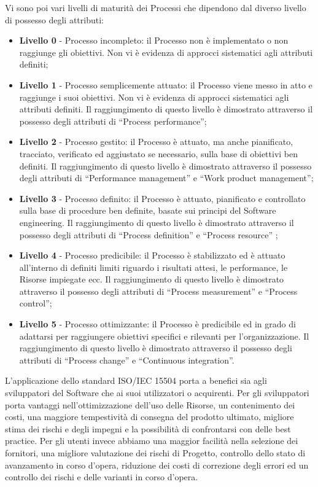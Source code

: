 Vi sono poi vari livelli di maturità dei Processi che dipendono dal diverso livello di possesso degli attributi:
\begin{itemize}
\item \textbf{Livello 0} - Processo incompleto: il Processo non è implementato o non raggiunge gli obiettivi. Non vi è evidenza di approcci sistematici agli attributi definiti;
\item \textbf{Livello 1} - Processo semplicemente attuato: il Processo viene messo in atto e raggiunge i suoi obiettivi. Non vi è evidenza di approcci sistematici agli attributi definiti. Il raggiungimento di questo livello è dimostrato attraverso il possesso degli attributi di “Process performance”;
\item \textbf{Livello 2} - Processo gestito: il Processo è attuato, ma anche pianificato, tracciato, verificato ed aggiustato se necessario, sulla base di obiettivi ben definiti. Il raggiungimento di questo livello è dimostrato attraverso il possesso degli attributi di “Performance management” e “Work product management”;
\item \textbf{Livello 3} - Processo definito: il Processo è attuato, pianificato e controllato sulla base di procedure ben definite, basate sui principi del Software engineering. Il raggiungimento di questo livello è dimostrato attraverso il possesso degli attributi di “Process definition” e “Process resource” ;
\item \textbf{Livello 4} - Processo predicibile: il Processo è stabilizzato ed è attuato all’interno di definiti limiti riguardo i risultati attesi, le performance, le Risorse impiegate ecc. Il raggiungimento di questo livello è dimostrato attraverso il possesso degli attributi di “Process measurement” e “Process control”;
\item \textbf{Livello 5} - Processo ottimizzante: il Processo è predicibile ed in grado di adattarsi per raggiungere obiettivi specifici e rilevanti per l’organizzazione.
Il raggiungimento di questo livello è dimostrato attraverso il possesso degli attributi di “Process change” e “Continuous integration”.
\end{itemize}

L’applicazione dello standard ISO/IEC 15504 porta a benefici sia agli sviluppatori del Software che ai suoi utilizzatori o acquirenti. Per gli sviluppatori porta vantaggi nell’ottimizzazione dell’uso delle Risorse, un contenimento dei costi, una maggiore tempestività di consegna del prodotto ultimato, migliore stima dei rischi e degli impegni e la possibilità di confrontarsi con delle best practice. 
Per gli utenti invece abbiamo una maggior facilità nella selezione dei fornitori, una migliore valutazione dei rischi di Progetto, controllo dello stato di avanzamento in corso d’opera, riduzione dei costi di correzione degli errori ed un controllo dei rischi e delle varianti in corso d’opera.


